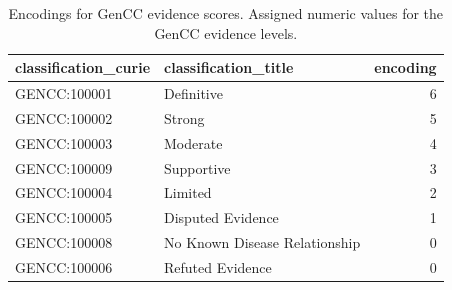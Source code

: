 \documentclass[
]{article}
\begin{document}
\begin{longtable}[]{@{}llr@{}}

\caption{\label{tbl-gencc}Encodings for GenCC evidence scores. Assigned
numeric values for the GenCC evidence levels.}

\tabularnewline

\toprule\noalign{}
classification\_curie & classification\_title & encoding \\
\midrule\noalign{}
\endhead
\bottomrule\noalign{}
\endlastfoot
GENCC:100001 & Definitive & 6 \\
GENCC:100002 & Strong & 5 \\
GENCC:100003 & Moderate & 4 \\
GENCC:100009 & Supportive & 3 \\
GENCC:100004 & Limited & 2 \\
GENCC:100005 & Disputed Evidence & 1 \\
GENCC:100008 & No Known Disease Relationship & 0 \\
GENCC:100006 & Refuted Evidence & 0 \\

\end{longtable}

\newpage{}
\end{document}
